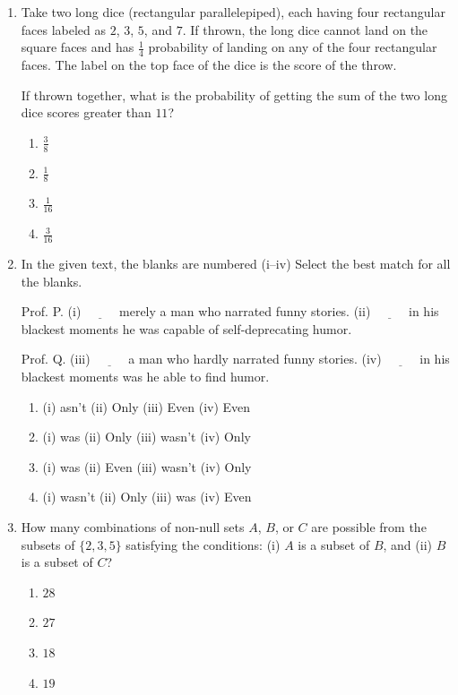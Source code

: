 \documentclass[journal,12pt,onecolumn]{IEEEtran}
\theoremstyle{remark}
\begin{document}
\begin{enumerate}
\item Take two long dice (rectangular parallelepiped), each having four rectangular faces labeled as $2$, $3$, $5$, and $7$. If thrown, the long dice cannot land on the square faces and has $\frac{1}{4}$ probability of landing on any of the four rectangular faces. The label on the top face of the dice is the score of the throw.

If thrown together, what is the probability of getting the sum of the two long dice scores greater than $11$?
\begin{enumerate}
    \item $\frac{3}{8}$
    \item $\frac{1}{8}$
    \item $\frac{1}{16}$
    \item $\frac{3}{16}$
\end{enumerate}
\item In the given text, the blanks are numbered (i–iv) Select the best match for all the blanks.

Prof. P. (i) $\underline{\hspace{1cm}}$ merely a man who narrated funny stories. (ii) $\underline{\hspace{1cm}}$ in his blackest moments he was capable of self-deprecating humor.

Prof. Q. (iii) $\underline{\hspace{1cm}}$ a man who hardly narrated funny stories. (iv) $\underline{\hspace{1cm}}$ in his blackest moments was he able to find humor.
\begin{enumerate}
    \item (i) asn't \quad (ii) Only \quad (iii) Even \quad (iv) Even
    \item (i) was \quad (ii) Only \quad (iii) wasn't \quad (iv) Only
    \item (i) was \quad (ii) Even \quad (iii) wasn't \quad (iv) Only
    \item (i) wasn't \quad (ii) Only \quad (iii) was \quad (iv) Even
\end{enumerate}

\item How many combinations of non-null sets $A$, $B$, or $C$ are possible from the subsets of $\{ 2, 3, 5 \}$ satisfying the conditions: (i) $A$ is a subset of $B$, and (ii) $B$ is a subset of $C$?
\begin{enumerate}
    \item $28$
    \item $27$
    \item $18$
    \item $19$
\end{enumerate}


\end{enumerate}
\end{document}

